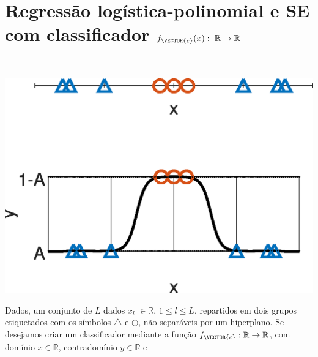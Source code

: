\newpage

\section{Regressão logística-polinomial e SE com classificador $f_{\VECTOR{c}}(x):~\mathbb{R} \rightarrow \mathbb{R}$}




\begin{theorem}\label{theo:reglogr1r1poly:1}
~\\
\noindent
\begin{minipage}{0.45\textwidth}
\centering
\includegraphics[width=0.95\linewidth]{chapters/classificacao/mfiles/reglogr1r1poly/reglogr1r1poly.eps} 
\end{minipage}
\begin{minipage}{0.55\textwidth}
Dados, um conjunto de $L$ dados 
$x_l$ $\in \mathbb{R}$, $1\leq l\leq L$,
repartidos em dois grupos etiquetados com os símbolos $\bigtriangleup$ e $\bigcirc$,
não separáveis por um hiperplano.
Se desejamos criar um classificador mediante 
a função  $f_{\VECTOR{c}}:\mathbb{R} \rightarrow \mathbb{R}$,
com domínio $x \in \mathbb{R}$, contradomínio $y \in \mathbb{R}$ e 

\end{minipage}
\end{theorem}
